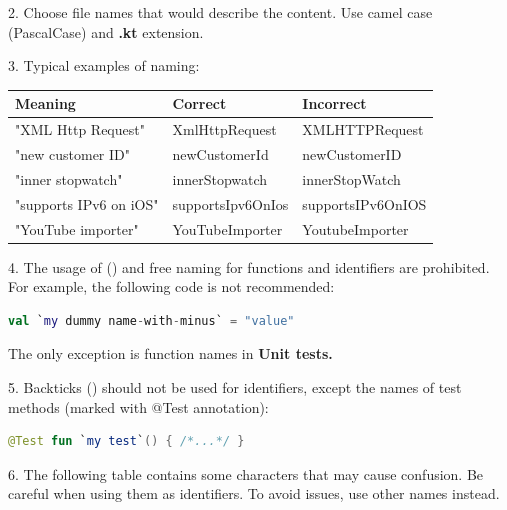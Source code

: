 {{{{{{{{{{{{2.	Choose file names that would describe the content. Use camel case (PascalCase) and \textbf{.kt} extension.



3.	Typical examples of naming:



\begin{center}

\begin{tabular}{ |p{5.0cm}|p{5.0cm}|p{5.0cm}| }

\hline

Meaning&Correct&Incorrect\\

\hline

 "XML Http Request" & XmlHttpRequest & XMLHTTPRequest \\

 "new customer ID" & newCustomerId & newCustomerID \\

 "inner stopwatch" & innerStopwatch & innerStopWatch \\

 "supports IPv6 on iOS" & supportsIpv6OnIos & supportsIPv6OnIOS \\

 "YouTube importer" & YouTubeImporter & YoutubeImporter \\

\hline

\end{tabular}

\end{center}

4.	The usage of (\textbf{}) and free naming for functions and identifiers are prohibited. For example, the following code is not recommended:



\begin{lstlisting}[language=Kotlin]
val `my dummy name-with-minus` = "value" 
\end{lstlisting}


The only exception is function names in \textbf{Unit tests.}



5.	Backticks (\textbf{}) should not be used for identifiers, except the names of test methods (marked with @Test annotation):

\begin{lstlisting}[language=Kotlin]
 @Test fun `my test`() { /*...*/ }
\end{lstlisting}
6.  The following table contains some characters that may cause confusion. Be careful when using them as identifiers. To avoid issues, use other names instead.

}}}}}}}}}}}}
